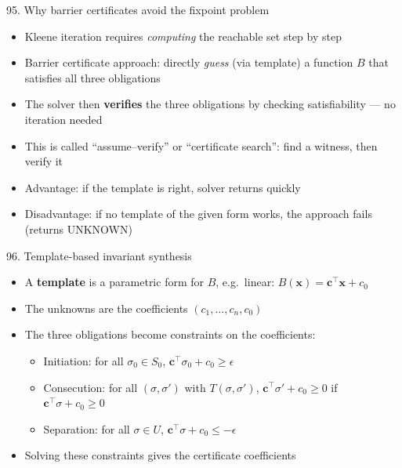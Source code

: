 \documentclass[aspectratio=169]{beamer}
\begin{document}
\begin{frame}{95. Why barrier certificates avoid the fixpoint problem}
\begin{itemize}
  \item Kleene iteration requires \emph{computing} the reachable set step by step
  \item Barrier certificate approach: directly \emph{guess} (via template) a function \(B\) that satisfies all three obligations
  \item The solver then \textbf{verifies} the three obligations by checking satisfiability --- no iteration needed
  \item This is called ``assume--verify'' or ``certificate search'': find a witness, then verify it
  \item Advantage: if the template is right, solver returns quickly
  \item Disadvantage: if no template of the given form works, the approach fails (returns UNKNOWN)
\end{itemize}
\end{frame}

\begin{frame}{96. Template-based invariant synthesis}
\begin{itemize}
  \item A \textbf{template} is a parametric form for \(B\), e.g.\ linear: \(B(\mathbf{x}) = \mathbf{c}^\top \mathbf{x} + c_0\)
  \item The unknowns are the coefficients \((c_1, \ldots, c_n, c_0)\)
  \item The three obligations become constraints on the coefficients:
    \begin{itemize}
      \item Initiation: for all \(\sigma_0 \in S_0\), \(\mathbf{c}^\top \sigma_0 + c_0 \ge \epsilon\)
      \item Consecution: for all \((\sigma, \sigma')\) with \(T(\sigma, \sigma')\), \(\mathbf{c}^\top \sigma' + c_0 \ge 0\) if \(\mathbf{c}^\top \sigma + c_0 \ge 0\)
      \item Separation: for all \(\sigma \in U\), \(\mathbf{c}^\top \sigma + c_0 \le -\epsilon\)
    \end{itemize}
  \item Solving these constraints gives the certificate coefficients
\end{itemize}
\end{frame}
\end{document}

